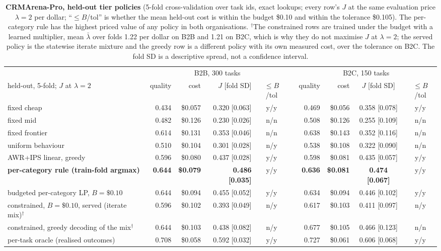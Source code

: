 \documentclass[10pt]{article}
\begin{document}
\begin{table}[t]\centering\footnotesize
\setlength{\tabcolsep}{3.5pt}
\begin{tabular}{lrrrcrrrcc}\toprule
& \multicolumn{4}{c}{B2B, 300 tasks} & & \multicolumn{4}{c}{B2C, 150 tasks} \\\cmidrule{2-5}\cmidrule{7-10}
held-out, 5-fold; $J$ at $\lambda=2$ & quality & cost & $J$ [fold SD] & $\le B$/tol & & quality & cost & $J$ [fold SD] & $\le B$/tol \\\midrule
fixed cheap & 0.434 & \$0.057 & 0.320 [0.063] & y/y & & 0.469 & \$0.056 & 0.358 [0.078] & y/y \\
fixed mid & 0.482 & \$0.126 & 0.230 [0.026] & n/n & & 0.508 & \$0.126 & 0.255 [0.109] & n/n \\
fixed frontier & 0.614 & \$0.131 & 0.353 [0.046] & n/n & & 0.638 & \$0.143 & 0.352 [0.116] & n/n \\
uniform behaviour & 0.510 & \$0.104 & 0.301 [0.028] & n/y & & 0.538 & \$0.108 & 0.322 [0.090] & n/n \\
AWR+IPS linear, greedy & 0.596 & \$0.080 & 0.437 [0.028] & y/y & & 0.598 & \$0.081 & 0.435 [0.057] & y/y \\
\textbf{per-category rule (train-fold argmax)} & \textbf{0.644} & \textbf{\$0.079} & \textbf{0.486 [0.035]} & y/y & & \textbf{0.636} & \textbf{\$0.081} & \textbf{0.474 [0.067]} & y/y \\
budgeted per-category LP, $B=\$0.10$ & 0.644 & \$0.094 & 0.455 [0.052] & y/y & & 0.634 & \$0.094 & 0.446 [0.102] & y/y \\
constrained, $B=\$0.10$, served (iterate mix)$^\dagger$ & 0.596 & \$0.102 & 0.393 [0.049] & n/y & & 0.617 & \$0.103 & 0.411 [0.097] & n/y \\
constrained, greedy decoding of the mix$^\dagger$ & 0.644 & \$0.103 & 0.438 [0.082] & n/y & & 0.677 & \$0.105 & 0.466 [0.123] & n/n \\
per-task oracle (realised outcomes) & 0.708 & \$0.058 & 0.592 [0.032] & y/y & & 0.727 & \$0.061 & 0.606 [0.068] & y/y \\\bottomrule
\end{tabular}
\caption{\textbf{CRMArena-Pro, held-out tier policies} (5-fold cross-validation over task ids, exact lookups; every row's $J$ at the same evaluation price $\lambda=2$ per dollar; ``$\le B$/tol'' is whether the mean held-out cost is within the budget \$0.10 and within the tolerance \$0.105). The per-category rule has the highest priced value of any policy in both organisations. $^\dagger$The constrained rows are trained under the budget with a learned multiplier, mean $\bar\lambda$ over folds 1.22 per dollar on B2B and 1.21 on B2C, which is why they do not maximise $J$ at $\lambda=2$; the served policy is the statewise iterate mixture and the greedy row is a different policy with its own measured cost, over the tolerance on B2C. The fold SD is a descriptive spread, not a confidence interval.}
\label{tab:crm150}
\end{table}
\end{document}

